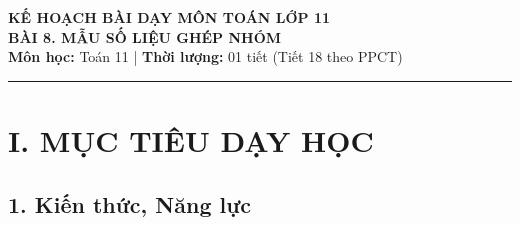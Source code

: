 \documentclass[12pt, a4paper]{article}
\begin{document}
\begin{center}
    {\Large \textbf{KẾ HOẠCH BÀI DẠY MÔN TOÁN LỚP 11}}\\[0.4em]
    {\LARGE \textbf{BÀI 8. MẪU SỐ LIỆU GHÉP NHÓM}}\\[0.5em]
    \textbf{Môn học:} Toán 11 | \textbf{Thời lượng:} 01 tiết (Tiết 18 theo PPCT)
\end{center}

\vspace{0.5em}
\hrule
\vspace{1em}

\section*{I. MỤC TIÊU DẠY HỌC}

\subsection*{1. Kiến thức, Năng lực}
\end{document}
